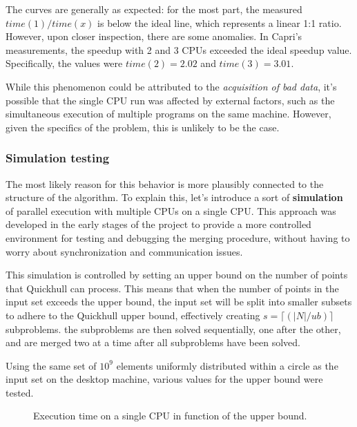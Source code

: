 \documentclass[a4paper]{article}
\begin{document}
The curves are generally as expected: for the most part, the measured $time(1)/time(x)$ is below the ideal line, which represents a linear 1:1 ratio.
However, upon closer inspection, there are some anomalies.
In Capri's measurements, the speedup with 2 and 3 CPUs exceeded the ideal speedup value.
Specifically, the values were $time(2) = 2.02$ and $time(3) = 3.01$.

While this phenomenon could be attributed to the \textit{acquisition of bad data}, it's possible that the single CPU run was affected by external factors, such as the simultaneous execution of multiple programs on the same machine.
However, given the specifics of the problem, this is unlikely to be the case.

\subsubsection{Simulation testing} \label{section:simul}

The most likely reason for this behavior is more plausibly connected to the structure of the algorithm.
To explain this, let's introduce a sort of \textbf{simulation} of parallel execution with multiple CPUs on a single CPU.
This approach was developed in the early stages of the project to provide a more controlled environment for testing and debugging the merging procedure, without having to worry about synchronization and communication issues.

This simulation is controlled by setting an upper bound on the number of points that Quickhull can process.
This means that when the number of points in the input set exceeds the upper bound, the input set will be split into smaller subsets to adhere to the Quickhull upper bound, effectively creating $s = \lceil (|N|/ub) \rceil$ subproblems.
the subproblems are then solved sequentially, one after the other, and are merged two at a time after all subproblems have been solved.

Using the same set of $10^9$ elements uniformly distributed within a circle as the input set on the desktop machine, various values for the upper bound were tested.

\begin{figure}[H]
    \centering
    \caption{Execution time on a single CPU in function of the upper bound.}
\end{figure}
\end{document}
